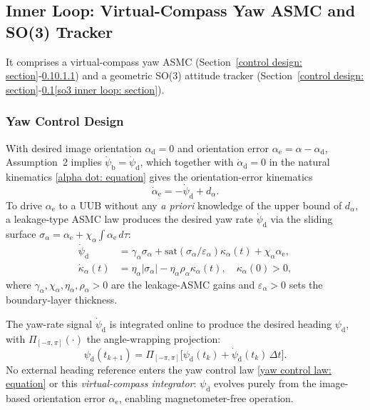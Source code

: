 \subsection{Inner Loop: Virtual-Compass Yaw ASMC and SO(3) Tracker} \label{inner loop: section}
 It comprises a virtual-compass yaw ASMC (Section~\ref{control design: section}-\ref{inner loop: section}\ref{yaw control: section}) and a geometric SO(3) attitude tracker (Section~\ref{control design: section}-\ref{inner loop: section}\ref{so3 inner loop: section}).

\subsubsection{Yaw Control Design} \label{yaw control: section}
With desired image orientation $\alpha_\text{d}=0$ and orientation error $\alpha_\text{e}=\alpha-\alpha_\text{d}$, Assumption~2 implies $\dot{\psi}_\text{b}=\dot{\psi}_\text{d}$, which together with $\dot{\alpha}_\text{d}=0$ in the natural kinematics \eqref{alpha dot: equation} gives the orientation-error kinematics
\begin{equation} \label{alpha_e_dot: equation}
    \dot{\alpha}_\text{e} = -\dot{\psi}_\text{d} + d_{\alpha}.
\end{equation}
To drive $\alpha_\text{e}$ to a UUB without any \emph{a priori} knowledge of the upper bound of $d_{\alpha}$, a leakage-type ASMC law produces the desired yaw rate $\dot{\psi}_\text{d}$ via the sliding surface $\sigma_{\alpha}=\alpha_\text{e}+\chi_{\alpha}\!\int\alpha_\text{e}\,d\tau$:
\begin{align} \label{yaw control law: equation}
    \dot{\psi}_\text{d} &= \gamma_{\alpha}\sigma_{\alpha} + \text{sat}(\sigma_{\alpha}/\varepsilon_{\alpha})\kappa_{\alpha}(t) + \chi_{\alpha} \alpha_\text{e}, \nonumber\\
    \dot{\kappa}_{\alpha}(t) &= \eta_{\alpha}|\sigma_{\alpha}| - \eta_{\alpha}\rho_{\alpha}\kappa_{\alpha}(t),\quad\kappa_{\alpha}(0)>0,
\end{align}
where $\gamma_{\alpha}, \chi_{\alpha}, \eta_{\alpha}, \rho_{\alpha} > 0$ are the leakage-ASMC gains and $\varepsilon_{\alpha}>0$ sets the boundary-layer thickness.

The yaw-rate signal $\dot{\psi}_\text{d}$ is integrated online to produce the desired heading $\psi_\text{d}$, with $\Pi_{[-\pi,\pi]}(\cdot)$ the angle-wrapping projection:
\begin{equation} \label{psi d integrator: equation}
    \psi_\text{d}(t_{k+1}) = \Pi_{[-\pi,\pi]}\!\big[\psi_\text{d}(t_k) + \dot{\psi}_\text{d}(t_k)\,\Delta t\big].
\end{equation}
No external heading reference enters the yaw control law \eqref{yaw control law: equation} or this \emph{virtual-compass integrator}: $\psi_\text{d}$ evolves purely from the image-based orientation error $\alpha_\text{e}$, enabling magnetometer-free operation.


